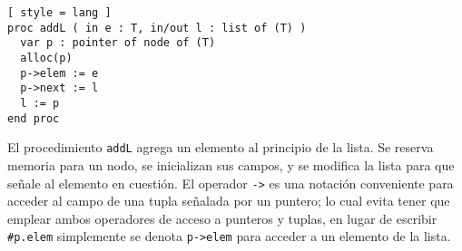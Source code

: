 \begin{lstlisting}[ style = lang ]
proc addL ( in e : T, in/out l : list of (T) )
  var p : pointer of node of (T)
  alloc(p)
  p->elem := e
  p->next := l
  l := p
end proc
\end{lstlisting}

El procedimiento \lstinline[style = lang]{addL} agrega un elemento al principio de la lista.
Se reserva memoria para un nodo, se inicializan sus campos, y se modifica la lista para que señale al elemento en cuestión.
El operador \lstinline[style = lang]{->} es una notación conveniente para acceder al campo de una tupla señalada por un puntero; lo cual evita tener que emplear ambos operadores de acceso a punteros y tuplas, en lugar de escribir \lstinline[style = lang]{#p.elem} simplemente se denota \lstinline[style = lang]{p->elem} para acceder a un elemento de la lista.

